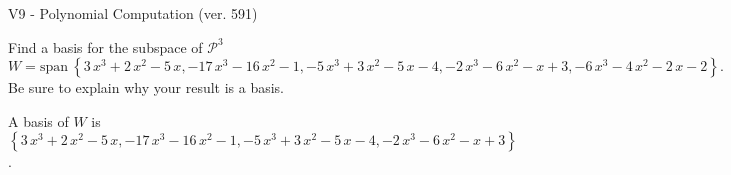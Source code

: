 \begin{exercise}
  \begin{exerciseTitle}V9 - Polynomial Computation (ver. 591)\end{exerciseTitle}
  \begin{exerciseStatement}
    Find a basis for the subspace of \(\mathcal{P}^3\) 
\[W=\mathrm{span}\ \left\{3 \, x^{3} + 2 \, x^{2} - 5 \, x , -17 \, x^{3} - 16 \, x^{2} - 1 , -5 \, x^{3} + 3 \, x^{2} - 5 \, x - 4 , -2 \, x^{3} - 6 \, x^{2} - x + 3 , -6 \, x^{3} - 4 \, x^{2} - 2 \, x - 2\right\}.\]
 Be sure to explain why your result is a basis.


  \end{exerciseStatement}
  \begin{exerciseAnswer}
   A basis of \(W\) is  \(\left\{3 \, x^{3} + 2 \, x^{2} - 5 \, x , -17 \, x^{3} - 16 \, x^{2} - 1 , -5 \, x^{3} + 3 \, x^{2} - 5 \, x - 4 , -2 \, x^{3} - 6 \, x^{2} - x + 3\right\}\).
  


  \end{exerciseAnswer}
\end{exercise}